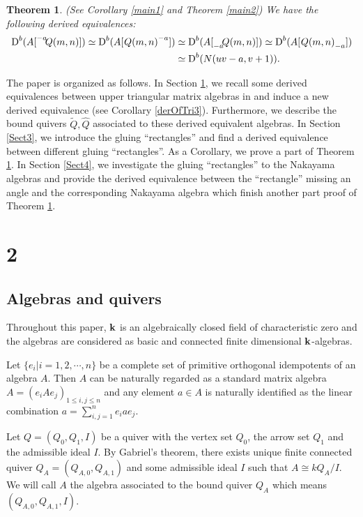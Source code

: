 \documentclass[a4paper, reqno]{amsart}
\newtheorem{thm}{Theorem}[section]
\theoremstyle{definition}
\theoremstyle{remark}
\numberwithin{equation}{section}
\begin{document}
\begin{thm}\label{main}
\textup{(See Corollary \ref{main1} and Theorem \ref{main2})} We have the following derived equivalences:
\begin{align*}
\textup{D}^{b}(A[{\vphantom{Q(m,n)}}^{-a}\negmedspace{Q(m,n)}]) \simeq \textup{D}^{b}(A[\;{\vphantom{Q(m,n)}}\negmedspace{Q(m,n)}^{-a}]) &\simeq \textup{D}^{b}(A[{\vphantom{Q(m,n)}}_{-a}\negmedspace{Q(m,n)}])\simeq \textup{D}^{b}(A[\;{\vphantom{Q(m,n)}}\negmedspace{Q(m,n)}_{-a}])\\
&\simeq{\textup{D}^{b}( N(uv-a,v+1))}.
\end{align*}  
\end{thm}

The paper is organized as follows. In Section \ref{Sect2}, we recall some derived equivalences between upper triangular matrix algebras in \cite{Lad2011} and induce a new derived equivalence (see Corollary \ref{derOfTri3}). Furthermore, we describe the bound quivers $\tilde{Q},\widehat{Q}$ associated to these derived equivalent algebras. In Section \ref{Sect3}, we introduce the gluing ``rectangles'' and find a derived equivalence between different gluing ``rectangles''. As a Corollary, we prove a part of Theorem \ref{main}. In Section \ref{Sect4}, we investigate the gluing ``rectangles'' to the Nakayama algebras and provide the derived equivalence between the ``rectangle'' missing an angle and the corresponding Nakayama algebra which finish another part proof of Theorem \ref{main}.

\section{2}\label{Sect2}

\subsection{Algebras and quivers}

Throughout this paper, ${\bf k}$ is an algebraically closed field of characteristic zero and the algebras are considered as basic and connected finite dimensional ${\bf k}$-algebras. 

Let $\{e_i|i=1,2,\cdots,n\}$ be a complete set of primitive orthogonal idempotents of an algebra $A$. Then $A$ can be naturally regarded as a standard matrix algebra $A=(e_iAe_j)_{1\leq i,j\leq n}$ and any element $a\in A$ is naturally identified as the linear combination $a = \sum_{i,j=1}^n e_i a e_j$.

Let $Q=(Q_0,Q_1,I)$ be a quiver with the vertex set $Q_0$, the arrow set $Q_1$ and the admissible ideal $I$. By Gabriel's theorem, there exists unique finite connected quiver $Q_A=(Q_{A,0},Q_{A,1})$ and some admissible ideal $I$ such that $A\cong kQ_A/I$. We will call $A$ the algebra associated to the bound quiver $Q_A$ which means $(Q_{A,0},Q_{A,1},I)$. 
\end{document}
